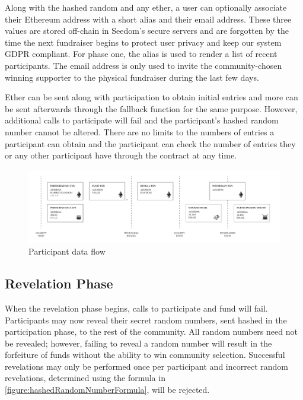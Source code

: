 \documentclass[11pt]{article}
\begin{document}
Along with the hashed random and any ether, a user can optionally associate their Ethereum address with a short alias and their email address. These three values are stored off-chain in Seedom's secure servers and are forgotten by the time the next fundraiser begins to protect user privacy and keep our system GDPR compliant. For phase one, the alias is used to render a list of recent participants. The email address is only used to invite the community-chosen winning supporter to the physical fundraiser during the last few days.

Ether can be sent along with participation to obtain initial entries and more can be sent afterwards through the fallback function for the same purpose. However, additional calls to participate will fail and the participant's hashed random number cannot be altered. There are no limits to the numbers of entries a participant can obtain and the participant can check the number of entries they or any other participant have through the contract at any time.

\begin{figure}[H]
\begin{center}
\includegraphics[width=1.0\textwidth]{participantDataFlow.pdf}
\caption{Participant data flow}
\label{figure:participantDataFlow}
\end{center}
\end{figure}

\subsection{Revelation Phase}

When the revelation phase begins, calls to participate and fund will fail. Participants may now reveal their secret random numbers, sent hashed in the participation phase, to the rest of the community. All random numbers need not be revealed; however, failing to reveal a random number will result in the forfeiture of funds without the ability to win community selection. Successful revelations may only be performed once per participant and incorrect random revelations, determined using the formula in \ref{figure:hashedRandomNumberFormula}, will be rejected.
\end{document}
